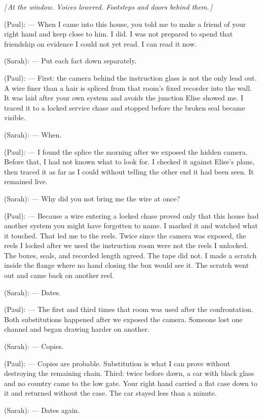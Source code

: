 \begin{room}
\centerline{\textit{[\,At the window. Voices lowered. Footsteps and doors behind them.\,]}}

(Paul): --- When I came into this house, you told me to make a friend of your right hand and keep close to him. I did. I was not prepared to spend that friendship on evidence I could not yet read. I can read it now.

(Sarah): --- Put each fact down separately.

(Paul): --- First: the camera behind the instruction glass is not the only lead out. A wire finer than a hair is spliced from that room's fixed recorder into the wall. It was laid after your own system and avoids the junction Elise showed me. I traced it to a locked service chase and stopped before the broken seal became visible.

(Sarah): --- When.

(Paul): --- I found the splice the morning after we exposed the hidden camera. Before that, I had not known what to look for. I checked it against Elise's plans, then traced it as far as I could without telling the other end it had been seen. It remained live.

(Sarah): --- Why did you not bring me the wire at once?

(Paul): --- Because a wire entering a locked chase proved only that this house had another system you might have forgotten to name. I marked it and watched what it touched. That led me to the reels. Twice since the camera was exposed, the reels I locked after we used the instruction room were not the reels I unlocked. The boxes, seals, and recorded length agreed. The tape did not. I made a scratch inside the flange where no hand closing the box would see it. The scratch went out and came back on another reel.

(Sarah): --- Dates.

(Paul): --- The first and third times that room was used after the confrontation. Both substitutions happened after we exposed the camera. Someone lost one channel and began drawing harder on another.

(Sarah): --- Copies.

(Paul): --- Copies are probable. Substitution is what I can prove without destroying the remaining chain. Third: twice before dawn, a car with black glass and no country came to the low gate. Your right hand carried a flat case down to it and returned without the case. The car stayed less than a minute.

(Sarah): --- Dates again.


\end{room}
